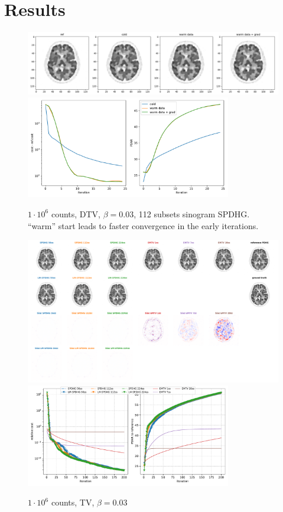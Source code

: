 \section{Results}

\begin{figure}
  \centering
    \includegraphics[width=1.0\textwidth]{figs/SPDHG_sino_init.png}
    \includegraphics[width=0.8\textwidth]{figs/SPDHG_sino_init_metrics.pdf}
  \caption{$1\cdot10^6$ counts, DTV, $\beta = 0.03$, 112 subsets sinogram SPDHG. ``warm'' start leads to faster convergence in the early iterations.}
\end{figure}


\begin{figure}
  \centering
    \includegraphics[width=1.0\textwidth]{./figs/brain2d_counts_1.0E+06_seed_1_beta_3.0E-02_prior_TV_niter_ref_20000_fwhm_4.5_4.5_niter_200.png}
    \includegraphics[width=0.8\textwidth]{./figs/brain2d_counts_1.0E+06_seed_1_beta_3.0E-02_prior_TV_niter_ref_20000_fwhm_4.5_4.5_niter_200_metrics.pdf}
  \caption{$1\cdot10^6$ counts, TV, $\beta = 0.03$}
\end{figure}

